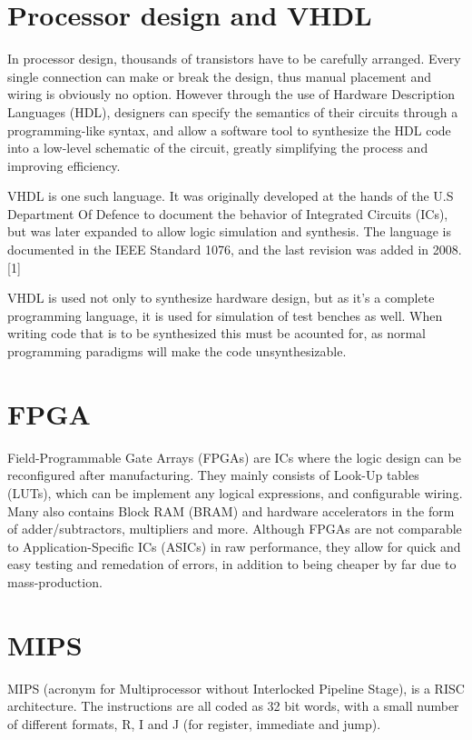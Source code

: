\section{Processor design and VHDL}
In processor design, thousands of transistors have to be carefully arranged.
Every single connection can make or break the design, thus manual placement and
wiring is obviously no option.  However through the use of Hardware Description
Languages (HDL), designers can specify the semantics of their circuits through a
programming-like syntax, and allow a software tool to synthesize the HDL code
into a low-level schematic of the circuit, greatly simplifying the process and
improving efficiency.


VHDL is one such language.  It was originally developed at the hands of the U.S
Department Of Defence to document the behavior of Integrated Circuits (ICs), but
was later expanded to allow logic simulation and synthesis. The language is
documented in the IEEE Standard 1076, and the last revision was added in
2008.[1]

VHDL is used not only to synthesize hardware design, but as it's a complete
programming language, it is used for simulation of test benches as well. When
writing code that is to be synthesized this must be acounted for, as normal
programming paradigms will make the code unsynthesizable.


\section{FPGA}
Field-Programmable Gate Arrays (FPGAs) are ICs where the logic design can be
reconfigured after manufacturing.  They mainly consists of Look-Up tables
(LUTs), which can be implement any logical expressions, and configurable wiring.
Many also contains Block RAM (BRAM) and hardware accelerators in the form of
adder/subtractors, multipliers and more.  Although FPGAs are not comparable to
Application-Specific ICs (ASICs) in raw performance, they allow for quick and
easy testing and remedation of errors, in addition to being cheaper by far due
to mass-production.


\section{MIPS}
MIPS (acronym for Multiprocessor without Interlocked Pipeline Stage), is a RISC
architecture. The instructions are all coded as 32 bit words, with a small
number of different formats, R, I and J (for register, immediate and jump). 

